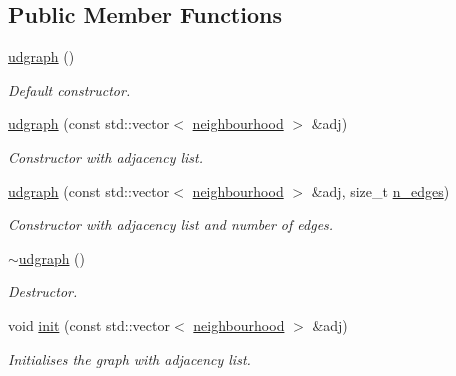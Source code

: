 \subsection*{Public Member Functions}
\begin{DoxyCompactItemize}
\item 
\mbox{\label{classlgraph_1_1udgraph_a19ec9ed8612253406313887f159ab428}} 
\hyperlink{classlgraph_1_1udgraph_a19ec9ed8612253406313887f159ab428}{udgraph} ()
\begin{DoxyCompactList}\small\item\em Default constructor. \end{DoxyCompactList}\item 
\hyperlink{classlgraph_1_1udgraph_a1cb1f1872b9274c9a9253b7c6e516607}{udgraph} (const std\+::vector$<$ \hyperlink{namespacelgraph_a052e7766c13f3a43cec0aec8173fdede}{neighbourhood} $>$ \&adj)
\begin{DoxyCompactList}\small\item\em Constructor with adjacency list. \end{DoxyCompactList}\item 
\hyperlink{classlgraph_1_1udgraph_a84bb75d8ec5b2621af504e7f7d843827}{udgraph} (const std\+::vector$<$ \hyperlink{namespacelgraph_a052e7766c13f3a43cec0aec8173fdede}{neighbourhood} $>$ \&adj, size\+\_\+t \hyperlink{classlgraph_1_1xxgraph_af00bce8b07a42754601d1e3bebe2c1fa}{n\+\_\+edges})
\begin{DoxyCompactList}\small\item\em Constructor with adjacency list and number of edges. \end{DoxyCompactList}\item 
\mbox{\label{classlgraph_1_1udgraph_a5d2d9e53db51d722f91a740a1a9c5825}} 
\hyperlink{classlgraph_1_1udgraph_a5d2d9e53db51d722f91a740a1a9c5825}{$\sim$udgraph} ()
\begin{DoxyCompactList}\small\item\em Destructor. \end{DoxyCompactList}\item 
void \hyperlink{classlgraph_1_1udgraph_a7f3cb28fb43c4002b41188ac8fd81d52}{init} (const std\+::vector$<$ \hyperlink{namespacelgraph_a052e7766c13f3a43cec0aec8173fdede}{neighbourhood} $>$ \&adj)
\begin{DoxyCompactList}\small\item\em Initialises the graph with adjacency list. \end{DoxyCompactList}\item 

\end{DoxyCompactItemize}
